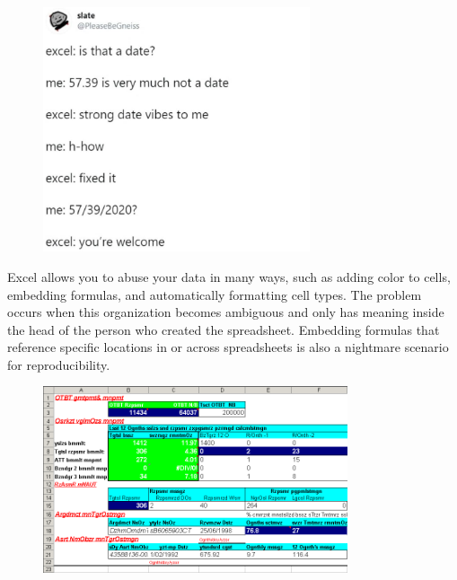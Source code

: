 \documentclass[
  letterpaper,
  DIV=11,
  numbers=noendperiod]{scrreprt}
\begin{document}
\begin{figure}

{\centering \includegraphics[width=0.7\textwidth,height=\textheight]{./img/excel_dates.JPG}

}

\end{figure}

Excel allows you to abuse your data in many ways, such as adding color
to cells, embedding formulas, and automatically formatting cell types.
The problem occurs when this organization becomes ambiguous and only has
meaning inside the head of the person who created the spreadsheet.
Embedding formulas that reference specific locations in or across
spreadsheets is also a nightmare scenario for reproducibility.

\begin{figure}

{\centering \includegraphics[width=0.8\textwidth,height=\textheight]{./img/excel_bad.png}

}

\end{figure}
\end{document}
